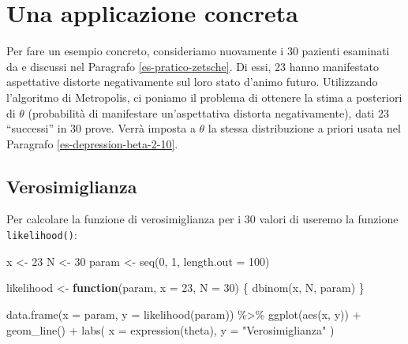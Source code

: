 \documentclass[
]{memoir}
\newenvironment{Shaded}{\begin{snugshade}}{\end{snugshade}}
\newcommand{\AttributeTok}[1]{\textcolor[rgb]{0.77,0.63,0.00}{#1}}
\newcommand{\ControlFlowTok}[1]{\textcolor[rgb]{0.13,0.29,0.53}{\textbf{#1}}}
\newcommand{\DecValTok}[1]{\textcolor[rgb]{0.00,0.00,0.81}{#1}}
\newcommand{\FunctionTok}[1]{\textcolor[rgb]{0.00,0.00,0.00}{#1}}
\newcommand{\NormalTok}[1]{#1}
\newcommand{\OtherTok}[1]{\textcolor[rgb]{0.56,0.35,0.01}{#1}}
\newcommand{\SpecialCharTok}[1]{\textcolor[rgb]{0.00,0.00,0.00}{#1}}
\newcommand{\StringTok}[1]{\textcolor[rgb]{0.31,0.60,0.02}{#1}}
\begin{document}
\hypertarget{una-applicazione-concreta}{%
\section{Una applicazione concreta}\label{una-applicazione-concreta}}

Per fare un esempio concreto, consideriamo nuovamente i 30 pazienti esaminati da \citet{zetschefuture2019} e discussi nel Paragrafo \ref{es-pratico-zetsche}. Di essi, 23 hanno manifestato aspettative distorte negativamente sul loro stato d'animo futuro. Utilizzando l'algoritmo di Metropolis, ci poniamo il problema di ottenere la stima a posteriori di \(\theta\) (probabilità di manifestare un'aspettativa distorta negativamente), dati 23 ``successi'' in 30 prove. Verrà imposta a \(\theta\) la stessa distribuzione a priori usata nel Paragrafo \ref{es-depression-beta-2-10}.

\hypertarget{verosimiglianza}{%
\subsection{Verosimiglianza}\label{verosimiglianza}}

Per calcolare la funzione di verosimiglianza per i 30 valori di \citet{zetschefuture2019} useremo la funzione \texttt{likelihood()}:

\begin{Shaded}
\begin{Highlighting}[]
\NormalTok{x }\OtherTok{\textless{}{-}} \DecValTok{23}
\NormalTok{N }\OtherTok{\textless{}{-}} \DecValTok{30}
\NormalTok{param }\OtherTok{\textless{}{-}} \FunctionTok{seq}\NormalTok{(}\DecValTok{0}\NormalTok{, }\DecValTok{1}\NormalTok{, }\AttributeTok{length.out =} \DecValTok{100}\NormalTok{)}

\NormalTok{likelihood }\OtherTok{\textless{}{-}} \ControlFlowTok{function}\NormalTok{(param, }\AttributeTok{x =} \DecValTok{23}\NormalTok{, }\AttributeTok{N =} \DecValTok{30}\NormalTok{) \{}
  \FunctionTok{dbinom}\NormalTok{(x, N, param)}
\NormalTok{\}}

\FunctionTok{data.frame}\NormalTok{(}\AttributeTok{x =}\NormalTok{ param, }\AttributeTok{y =} \FunctionTok{likelihood}\NormalTok{(param)) }\SpecialCharTok{\%\textgreater{}\%}
  \FunctionTok{ggplot}\NormalTok{(}\FunctionTok{aes}\NormalTok{(x, y)) }\SpecialCharTok{+}
  \FunctionTok{geom\_line}\NormalTok{() }\SpecialCharTok{+}
  \FunctionTok{labs}\NormalTok{(}
    \AttributeTok{x =} \FunctionTok{expression}\NormalTok{(theta),}
    \AttributeTok{y =} \StringTok{"Verosimiglianza"}
\NormalTok{  )}
\end{Highlighting}
\end{Shaded}
\end{document}
